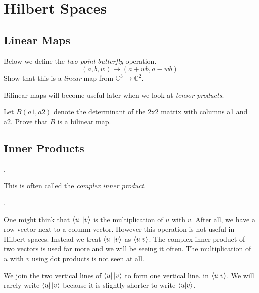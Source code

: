 
\chapter{Hilbert Spaces}


\section{Linear Maps}

\begin{example}
Below we define the \textit{two-point butterfly} operation.
$$(a,b,w) \mapsto (a + wb, a-wb)$$
Show that this is a \textit{linear} map from $\mathbb{C}^3 \rightarrow \mathbb{C}^2$. 
\end{example}




Bilinear maps will become useful later when we look at \textit{tensor products}.

\begin{example}
Let $B(a1,a2)$ denote the determinant of the 2x2 matrix with columns a1 and a2.
Prove that $B$ is a bilinear map. 
\end{example}



\section{Inner Products}


.

This is often called the \textit{complex inner product}. 




.

One might think that $\left\langle u\right|\left|v\right\rangle$ is the multiplication of $u$ with $v$.
After all, we have a row vector next to a column vector. 
However this operation is not useful in Hilbert spaces.  
Instead we treat $\left\langle u\right|\left|v\right\rangle$ as $\left\langle u | v\right\rangle$. The complex 
inner product of two vectors is used far more and we will be seeing it often. 
The multiplication of $u$ with $v$ using dot products is not seen at all. 

We join the two vertical lines of $\left\langle u\right|\left|v\right\rangle$ to form one vertical line. 
in $\left\langle u | v\right\rangle$. We will rarely write $\left\langle u\right|\left|v\right\rangle$ because it is 
slightly shorter to write $\left\langle u | v\right\rangle$. 